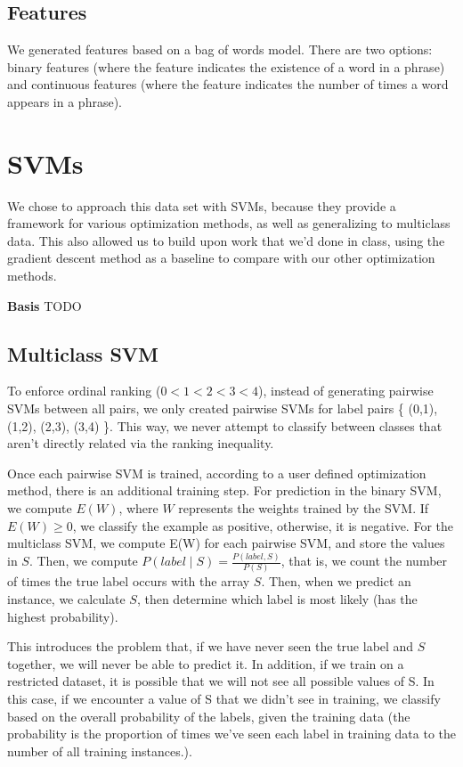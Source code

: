 \documentclass[letterpaper, 11pt]{article}
\begin{document}
\subsection{Features}
We generated features based on a bag of words model.  There are two options: binary features (where the feature indicates the existence of a word in a phrase) and continuous features (where the feature indicates the number of times a word appears in a phrase).

\section{SVMs}

We chose to approach this data set with SVMs, because they provide a framework for various optimization methods, as well as generalizing to multiclass data.  This also allowed us to build upon work that we'd done in class, using the gradient descent method as a baseline to compare with our other optimization methods.

\textbf{Basis} TODO

\subsection{Multiclass SVM}
To enforce ordinal ranking ($0 < 1 < 2 < 3 < 4$), instead of generating pairwise SVMs between all pairs, we only created pairwise SVMs for label pairs \{ (0,1), (1,2), (2,3), (3,4) \}.  This way, we never attempt to classify between classes that aren't directly related via the ranking inequality.

Once each pairwise SVM is trained, according to a user defined optimization method, there is an additional training step.  For prediction in the binary SVM, we compute $E(W)$, where $W$ represents the weights trained by the SVM.  If $E(W) \ge 0$, we classify the example as positive, otherwise, it is negative.  For the multiclass SVM, we compute E(W) for each pairwise SVM, and store the values in $S$.  Then, we compute $P(label \mid S) = \frac{P(label, S)}{P(S)}$, that is, we count the number of times the true label occurs with the array $S$.  Then, when we predict an instance, we calculate $S$, then determine which label is most likely (has the highest probability).

This introduces the problem that, if we have never seen the true label and $S$ together, we will never be able to predict it.  In addition, if we train on a restricted dataset, it is possible that we will not see all possible values of S.  In this case, if we encounter a value of S that we didn't see in training, we classify based on the overall probability of the labels, given the training data (the probability is the proportion of times we've seen each label in training data to the number of all training instances.).
\end{document}

